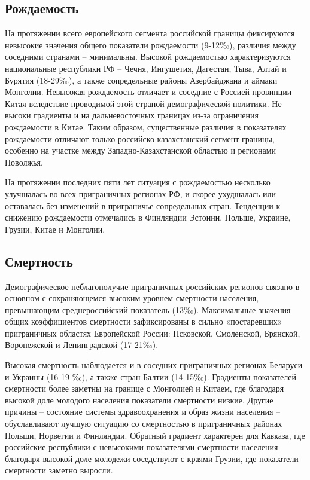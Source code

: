 \documentclass[]{book}
\begin{document}
\subsection{Рождаемость}\label{demo-situ-bir}

На протяжении всего европейского сегмента российской границы фиксируются
невысокие значения общего показатели рождаемости (9-12‰), различия между
соседними странами -- минимальны. Высокой рождаемостью характеризуются
национальные республики РФ -- Чечня, Ингушетия, Дагестан, Тыва, Алтай и
Бурятия (18-29‰), а также сопредельные районы Азербайджана и аймаки
Монголии. Невысокая рождаемость отличает и соседние с Россией провинции
Китая вследствие проводимой этой страной демографической политики. Не
высоки градиенты и на дальневосточных границах из-за ограничения
рождаемости в Китае. Таким образом, существенные различия в показателях
рождаемости отличают только российско-казахстанский сегмент границы,
особенно на участке между Западно-Казахстанской областью и регионами
Поволжья.

На протяжении последних пяти лет ситуация с рождаемостью несколько
улучшалась во всех приграничных регионах РФ, и скорее ухудшалась или
оставалась без изменений в приграничье сопредельных стран. Тенденции к
снижению рождаемости отмечались в Финляндии Эстонии, Польше, Украине,
Грузии, Китае и Монголии.

\subsection{Смертность}\label{demo-situ-dea}

Демографическое неблагополучие приграничных российских регионов связано
в основном с сохраняющемся высоким уровнем смертности населения,
превышающим среднероссийский показатель (13‰). Максимальные значения
общих коэффициентов смертности зафиксированы в сильно «постаревших»
приграничных областях Европейской России: Псковской, Смоленской,
Брянской, Воронежской и Ленинградской (17-21‰).

Высокая смертность наблюдается и в соседних приграничных регионах
Беларуси и Украины (16-19 ‰), а также стран Балтии (14-15‰). Градиенты
показателей смертности более заметны на границе с Монголией и Китаем,
где благодаря высокой доле молодого населения показатели смертности
низкие. Другие причины -- состояние системы здравоохранения и образ
жизни населения -- обуславливают лучшую ситуацию со смертностью в
приграничных районах Польши, Норвегии и Финляндии. Обратный градиент
характерен для Кавказа, где российские республики с невысокими
показателями смертности населения благодаря высокой доле молодежи
соседствуют с краями Грузии, где показатели смертности заметно выросли.
\end{document}
